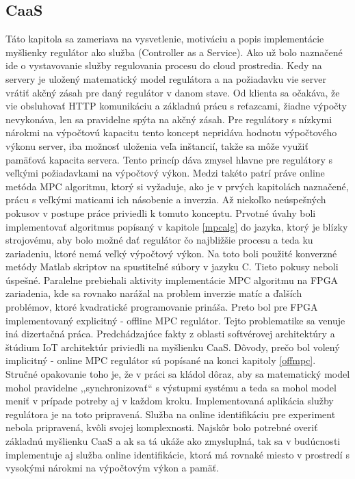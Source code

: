 \subsection{CaaS} \label{caas}
Táto kapitola sa zameriava na vysvetlenie, motiváciu a popis implementácie myšlienky regulátor ako služba (Controller as a Service). Ako už bolo naznačené ide o vystavovanie služby regulovania procesu do cloud prostredia. Kedy na servery je uložený matematický model regulátora a na požiadavku vie server vrátiť akčný zásah pre daný regulátor v danom stave. Od klienta sa očakáva, že vie obsluhovať HTTP komunikáciu a základnú prácu s reťazcami, žiadne výpočty nevykonáva, len sa pravidelne spýta na akčný zásah. Pre regulátory s nízkymi nárokmi na výpočtovú kapacitu tento koncept nepridáva hodnotu výpočtového výkonu server, iba možnosť uloženia veľa inštancií, takže sa môže využiť pamäťová kapacita servera. Tento princíp dáva zmysel hlavne pre regulátory s veľkými požiadavkami na výpočtový výkon. Medzi takéto patrí práve online metóda MPC algoritmu, ktorý si vyžaduje, ako je v prvých kapitolách naznačené, prácu s veľkými maticami ich násobenie a  inverzia. Až niekoľko neúspešných pokusov v postupe práce priviedli k tomuto konceptu. Prvotné úvahy boli implementovať algoritmus popísaný v kapitole \ref{mpcalg} do jazyka, ktorý je blízky strojovému, aby bolo možné dať regulátor čo najbližšie procesu a teda ku zariadeniu, ktoré nemá veľký výpočtový výkon. Na toto boli použité konverzné metódy Matlab skriptov na spustiteľné súbory v jazyku C. Tieto pokusy neboli úspešné. Paralelne prebiehali aktivity implementácie MPC algoritmu na FPGA zariadenia, kde sa rovnako narážal na problem inverzie matíc a ďalších problémov, ktoré kvadratické programovanie prináša. Preto bol pre FPGA implementovaný explicitný - offline MPC regulátor. Tejto problematike sa venuje iná dizertačná práca. Predchádzajúce fakty z oblasti softvérovej architektúry a štúdium IoT architektúr priviedli na myšlienku CaaS. Dôvody, prečo bol volený implicitný - online MPC regulátor sú popísané na konci kapitoly \ref{offmpc}. Stručné opakovanie toho je, že v práci sa kládol dôraz, aby sa matematický model mohol pravidelne ,,synchronizovať`` s výstupmi systému a teda sa mohol model meniť v prípade potreby aj v každom kroku. Implementovaná aplikácia služby regulátora je na toto pripravená. Služba na online identifikáciu pre experiment nebola pripravená, kvôli svojej komplexnosti. Najskôr bolo potrebné overiť základnú myšlienku CaaS a ak sa tá ukáže ako zmysluplná, tak sa v budúcnosti implementuje aj služba online identifikácie, ktorá má rovnaké miesto v prostredí s vysokými nárokmi na výpočtovým výkon a pamäť.
